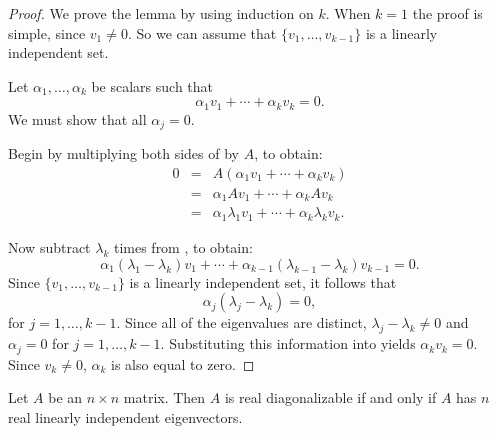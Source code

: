 \documentclass{ximera}
\begin{document}
\begin{proof} We prove the lemma by using induction on $k$.  When $k=1$
the proof is simple, since $v_1\neq 0$.  So we can assume that
$\{v_1,\ldots,v_{k-1}\}$ is a linearly independent set. 

Let $\alpha_1,\ldots,\alpha_k$ be scalars such that
\begin{equation}  \label{e:linindep}
\alpha_1 v_1 + \cdots + \alpha_k v_k = 0.
\end{equation}
We must show that all $\alpha_j=0$.

Begin by multiplying both sides of  by $A$, to
obtain: 
\begin{eqnarray}
0 & = & A(\alpha_1 v_1 + \cdots + \alpha_k v_k) \nonumber \\
& = & \alpha_1 Av_1 + \cdots + \alpha_k Av_k \label{e:linother}\\
& = & \alpha_1 \lambda_1 v_1 + \cdots + \alpha_k \lambda_k v_k.\nonumber
\end{eqnarray}

Now subtract $\lambda_k$ times  from ,
to obtain:
\[
\alpha_1(\lambda_1-\lambda_k)v_1 + \cdots +
\alpha_{k-1}(\lambda_{k-1}-\lambda_k)v_{k-1} = 0.
\]
Since $\{v_1,\ldots,v_{k-1}\}$ is a linearly independent set, it
follows that 
\[
\alpha_j(\lambda_j-\lambda_k)=0,
\]
for $j=1,\ldots,k-1$.  Since all of the eigenvalues are
distinct, $\lambda_j-\lambda_k\neq 0$ and $\alpha_j=0$ for
$j=1,\ldots,k-1$. Substituting this information into
 yields $\alpha_k v_k=0$.  Since $v_k\neq 0$, 
$\alpha_k$ is also equal to zero.  \end{proof}

\begin{lemma}  \label{L:eigenv-diag}
Let $A$ be an $n\times n$ matrix.  Then $A$ is real diagonalizable if
and only if $A$ has $n$ real linearly independent 
eigenvectors.
\end{lemma}  
\end{document}
